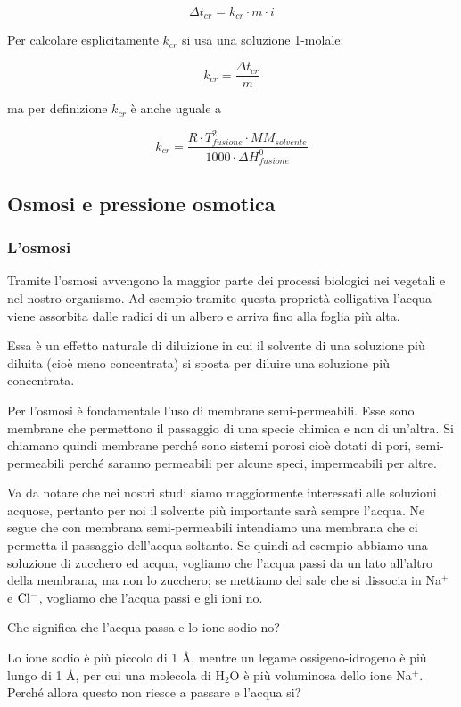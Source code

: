 $$\Delta t_{cr}=k_{cr} \cdot m \cdot i$$

Per calcolare esplicitamente $k_{cr}$ si usa una soluzione 1-molale:

$$k_{cr} = \frac{\Delta t_{cr}}{m}$$

ma per definizione $k_{cr}$ è anche uguale a

$$k_{cr}=\frac{R \cdot T_{fusione}^2 \cdot MM_{solvente}}{1000 \cdot \Delta H^0_{fusione}}$$

\subsection{Osmosi e pressione osmotica}
\subsubsection{L'osmosi}
Tramite l'osmosi avvengono la maggior parte dei processi biologici nei vegetali e nel nostro organismo. Ad esempio tramite questa proprietà colligativa l'acqua viene assorbita dalle radici di un albero e arriva fino alla foglia più alta.

Essa è un effetto naturale di diluizione in cui il solvente di una soluzione più diluita (cioè meno concentrata) si sposta per diluire una soluzione più concentrata.

Per l'osmosi è fondamentale l'uso di membrane semi-permeabili. Esse sono membrane che permettono il passaggio di una specie chimica e non di un'altra. Si chiamano quindi membrane perché sono sistemi porosi cioè dotati di pori, semi-permeabili perché saranno permeabili per alcune speci, impermeabili per altre.

Va da notare che nei nostri studi siamo maggiormente interessati alle soluzioni acquose, pertanto per noi il solvente più importante sarà sempre l'acqua. Ne segue che con membrana semi-permeabili intendiamo una membrana che ci permetta il passaggio dell'acqua soltanto. Se quindi ad esempio abbiamo una soluzione di zucchero ed acqua, vogliamo che l'acqua passi da un lato all'altro della membrana, ma non lo zucchero; se mettiamo del sale che si dissocia in Na$^+$ e $\rm Cl^-$, vogliamo che l'acqua passi e gli ioni no.

Che significa che l'acqua passa e lo ione sodio no?

Lo ione sodio è più piccolo di 1 Å, mentre un legame ossigeno-idrogeno è più lungo di 1 Å, per cui una molecola di H$_2$O è più voluminosa dello ione Na$^+$. Perché allora questo non riesce a passare e l'acqua si?

